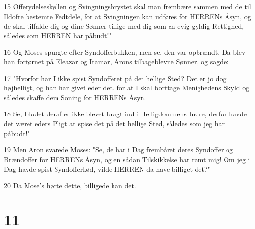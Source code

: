 \par 15 Offerydelseskøllen og Svingningsbrystet skal man frembære sammen med de til Ildofre bestemte Fedtdele, for at Svingningen kan udføres for HERRENs Åsyn, og de skal tilfalde dig og dine Sønner tillige med dig som en evig gyldig Rettighed, således som HERREN har påbudt!"
\par 16 Og Moses spurgte efter Syndofferbukken, men se, den var opbrændt. Da blev han fortørnet på Eleazar og Itamar, Arons tilbageblevne Sønner, og sagde:
\par 17 "Hvorfor har I ikke spist Syndofferet på det hellige Sted? Det er jo dog højhelligt, og han har givet eder det. for at I skal borttage Menighedens Skyld og således skaffe dem Soning for HERRENs Åsyn.
\par 18 Se, Blodet deraf er ikke blevet bragt ind i Helligdommens Indre, derfor havde det været eders Pligt at spise det på det hellige Sted, således som jeg har påbudt!"
\par 19 Men Aron svarede Moses: "Se, de har i Dag frembåret deres Syndoffer og Brændoffer for HERRENs Åsyn, og en sådan Tilskikkelse har ramt mig! Om jeg i Dag havde spist Syndofferkød, vilde HERREN da have billiget det?"
\par 20 Da Mose's hørte dette, billigede han det.

\chapter{11}

